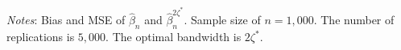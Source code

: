 \documentclass[12pt,fleqn]{article}
\theoremstyle{definition}
\newcommand{\wh}{\widehat}
\newcommand{\hROT}{\zeta^*}
\begin{document}
\begin{sidewaystable}[!htbp]
\begin{adjustbox}{scale=0.99,right}
\begin{threeparttable}
\begin{tablenotes}
\scriptsize
\item \textit{Notes}: Bias and MSE of $\wh{\beta}_{n}$ and $\wh{\beta}_{n}^{2\hROT}$. Sample size of $n=1,000$. The number of replications is $5,000$. The optimal bandwidth is $2\hROT$.
\end{tablenotes}
\end{threeparttable}
\end{adjustbox}
\end{sidewaystable}  
\end{document}
